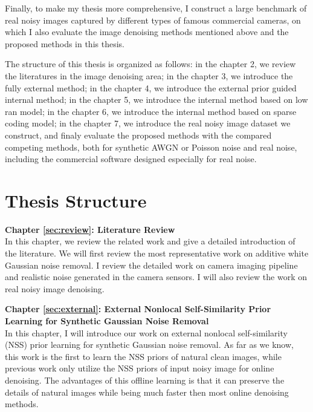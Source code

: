 Finally, to make my thesis more comprehensive, I construct a large benchmark of real noisy images captured by different types of famous commercial cameras, on which I also evaluate the image denoising methods mentioned above and the proposed methods in this thesis. 




The structure of this thesis is organized as follows: in the chapter 2, we review the literatures in the image denoising area; in the chapter 3, we introduce the fully external method; in the chapter 4, we introduce the external prior guided internal method; in the chapter 5, we introduce the internal method based on low ran model; in the chapter 6, we introduce the internal method based on sparse coding model; in the chapter 7, we introduce the real noisy image dataset we construct, and finaly evaluate the proposed methods with the compared competing methods, both for synthetic AWGN or Poisson noise and real noise, including the commercial software designed especially for real noise. 


\section{Thesis Structure}
\label{sec:intro:structure}


\textbf{Chapter \ref{sec:review}: Literature Review} \\[0.2em]

In this chapter, we review the related work and give a detailed introduction of the literature. We will first review the most representative work on additive white Gaussian noise removal. I review the detailed work on camera imaging pipeline and realistic noise generated in the camera sensors. I will also review the work on real noisy image denoising.



\textbf{Chapter \ref{sec:external}: External Nonlocal Self-Similarity Prior Learning for Synthetic Gaussian Noise Removal} \\[0.2em]

In this chapter, I will introduce our work on external nonlocal self-similarity (NSS) prior learning for synthetic Gaussian noise removal. As far as we know, this work is the first to learn the NSS priors of natural clean images, while previous work only utilize the NSS priors of input noisy image for online denoising. The advantages of this offline learning is that it can preserve the details of natural images while being much faster then most online denoising methods.


